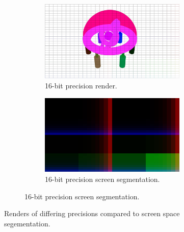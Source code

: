 \documentclass[conference]{IEEEtran}
\begin{document}
\begin{figure}[htbp]
\begin{subfigure}{1.1\textwidth}
\end{subfigure}
\par\medskip
\begin{subfigure}{1.1\textwidth}
\begin{center}
\begin{minipage}[t]{\linewidth}
\hspace{-0.09\linewidth}
  \centering
    \begin{subfigure}{.49\textwidth}
      \centering
      \includegraphics[width=\linewidth]{16_render.jpg}
      \caption{16-bit precision render.}
      \label{fig:render_8}
    \end{subfigure}
    \begin{subfigure}{.49\textwidth}
      \centering
      \includegraphics[width=\linewidth]{16_partition.jpg}
      \caption{16-bit precision screen segmentation.}
      \label{fig:render_8}
    \end{subfigure}
  \label{fig:render_16}
\end{minipage}
\end{center}
\end{subfigure}
\caption{Renders of differing precisions compared to screen space segementation.}
\label{fig:render_comparisons}
\end{figure}
\end{document}
